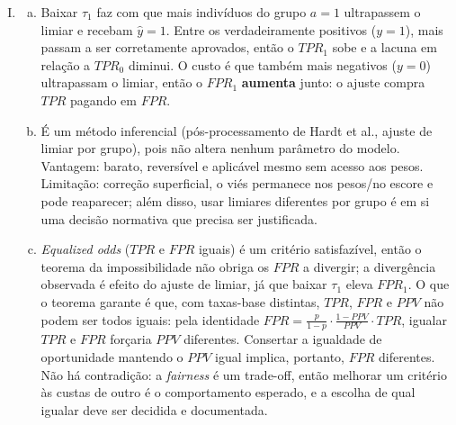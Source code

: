 \documentclass{dlproblemset}
\begin{document}
\begin{enumerate}[I)]
    \item
    \begin{enumerate}[(a)]
        \item Baixar $\tau_1$ faz com que mais indivíduos do grupo $a{=}1$ ultrapassem o limiar e recebam $\hat{y}{=}1$. Entre os verdadeiramente positivos ($y{=}1$), mais passam a ser corretamente aprovados, então o $TPR_1$ sobe e a lacuna em relação a $TPR_0$ diminui. O custo é que também mais negativos ($y{=}0$) ultrapassam o limiar, então o $FPR_1$ \textbf{aumenta} junto: o ajuste compra $TPR$ pagando em $FPR$.
        \item É um método inferencial (pós-processamento de Hardt et al., ajuste de limiar por grupo), pois não altera nenhum parâmetro do modelo. Vantagem: barato, reversível e aplicável mesmo sem acesso aos pesos. Limitação: correção superficial, o viés permanece nos pesos/no escore e pode reaparecer; além disso, usar limiares diferentes por grupo é em si uma decisão normativa que precisa ser justificada.
        \item \textit{Equalized odds} ($TPR$ e $FPR$ iguais) é um critério satisfazível, então o teorema da impossibilidade não obriga os $FPR$ a divergir; a divergência observada é efeito do ajuste de limiar, já que baixar $\tau_1$ eleva $FPR_1$. O que o teorema garante é que, com taxas-base distintas, $TPR$, $FPR$ e $PPV$ não podem ser todos iguais: pela identidade $FPR = \frac{p}{1-p}\cdot\frac{1-PPV}{PPV}\cdot TPR$, igualar $TPR$ e $FPR$ forçaria $PPV$ diferentes. Consertar a igualdade de oportunidade mantendo o $PPV$ igual implica, portanto, $FPR$ diferentes. Não há contradição: a \textit{fairness} é um trade-off, então melhorar um critério às custas de outro é o comportamento esperado, e a escolha de qual igualar deve ser decidida e documentada.
    \end{enumerate}
\end{enumerate}

\color{black}
\end{document}
